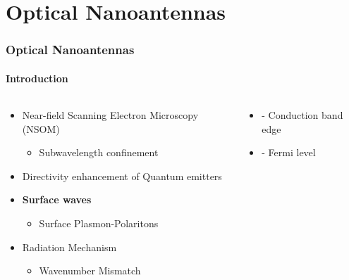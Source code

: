 \documentclass[mathserif,18pt,xcolor=table]{beamer}
\begin{document}
        \section{Optical Nanoantennas}
        \begin{frame}
          \frametitle{Optical Nanoantennas}
          \framesubtitle{Introduction}
          \begin{columns} %
            \begin{column}{.5\textwidth}
              \begin{minipage}[T][.1\textheight][c]{\linewidth}
                \begin{itemize}
                  \item Near-field Scanning Electron Microscopy (NSOM)
                  \begin{itemize}
                    \item[] Subwavelength confinement
                  \end{itemize}
                  \item Directivity enhancement of Quantum emitters
                  \item \textbf{Surface waves}
                  \begin{itemize}
                    \item[]{Surface Plasmon-Polaritons}
                  \end{itemize}
                  \item Radiation Mechanism
                  \begin{itemize}
                    \item[]{Wavenumber Mismatch}
                  \end{itemize}
                \end{itemize}
              \end{minipage}
            \end{column}
            \begin{column}{.5\textwidth}
              \begin{itemize}
                \item[]{ - Conduction band edge}
                \item[]{ - Fermi level}
              \end{itemize}
              \end{column}%
            \end{columns}
          \end{frame}
\end{document}

